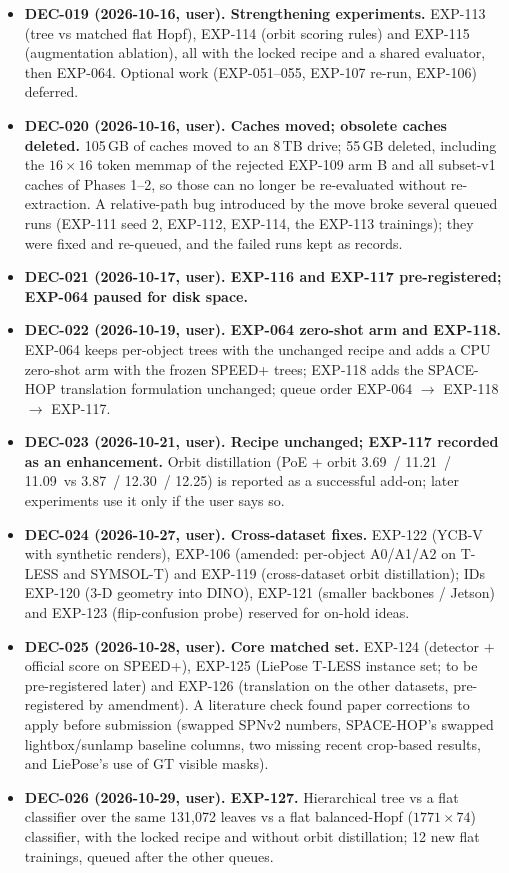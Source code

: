 \begin{itemize}
\item \textbf{DEC-019 (2026-10-16, user). Strengthening experiments.} EXP-113 (tree vs matched flat Hopf), EXP-114 (orbit scoring rules) and EXP-115 (augmentation ablation), all with the locked recipe and a shared evaluator, then EXP-064. Optional work (EXP-051--055, EXP-107 re-run, EXP-106) deferred.
\item \textbf{DEC-020 (2026-10-16, user). Caches moved; obsolete caches deleted.} 105\,GB of caches moved to an 8\,TB drive; 55\,GB deleted, including the $16\times16$ token memmap of the rejected EXP-109 arm B and all subset-v1 caches of Phases 1--2, so those can no longer be re-evaluated without re-extraction. A relative-path bug introduced by the move broke several queued runs (EXP-111 seed 2, EXP-112, EXP-114, the EXP-113 trainings); they were fixed and re-queued, and the failed runs kept as records.
\item \textbf{DEC-021 (2026-10-17, user). EXP-116 and EXP-117 pre-registered; EXP-064 paused for disk space.}
\item \textbf{DEC-022 (2026-10-19, user). EXP-064 zero-shot arm and EXP-118.} EXP-064 keeps per-object trees with the unchanged recipe and adds a CPU zero-shot arm with the frozen SPEED+ trees; EXP-118 adds the SPACE-HOP translation formulation unchanged; queue order EXP-064 $\to$ EXP-118 $\to$ EXP-117.
\item \textbf{DEC-023 (2026-10-21, user). Recipe unchanged; EXP-117 recorded as an enhancement.} Orbit distillation (PoE + orbit 3.69\appDdeg\ / 11.21\appDdeg\ / 11.09\appDdeg\ vs 3.87\appDdeg\ / 12.30\appDdeg\ / 12.25\appDdeg) is reported as a successful add-on; later experiments use it only if the user says so.
\item \textbf{DEC-024 (2026-10-27, user). Cross-dataset fixes.} EXP-122 (YCB-V with synthetic renders), EXP-106 (amended: per-object A0/A1/A2 on T-LESS and SYMSOL-T) and EXP-119 (cross-dataset orbit distillation); IDs EXP-120 (3-D geometry into DINO), EXP-121 (smaller backbones / Jetson) and EXP-123 (flip-confusion probe) reserved for on-hold ideas.
\item \textbf{DEC-025 (2026-10-28, user). Core matched set.} EXP-124 (detector + official score on SPEED+), EXP-125 (LiePose T-LESS instance set; to be pre-registered later) and EXP-126 (translation on the other datasets, pre-registered by amendment). A literature check found paper corrections to apply before submission (swapped SPNv2 numbers, SPACE-HOP's swapped lightbox/sunlamp baseline columns, two missing recent crop-based results, and LiePose's use of GT visible masks).
\item \textbf{DEC-026 (2026-10-29, user). EXP-127.} Hierarchical tree vs a flat classifier over the same 131,072 leaves vs a flat balanced-Hopf ($1771\times74$) classifier, with the locked recipe and without orbit distillation; 12 new flat trainings, queued after the other queues.
\end{itemize}

